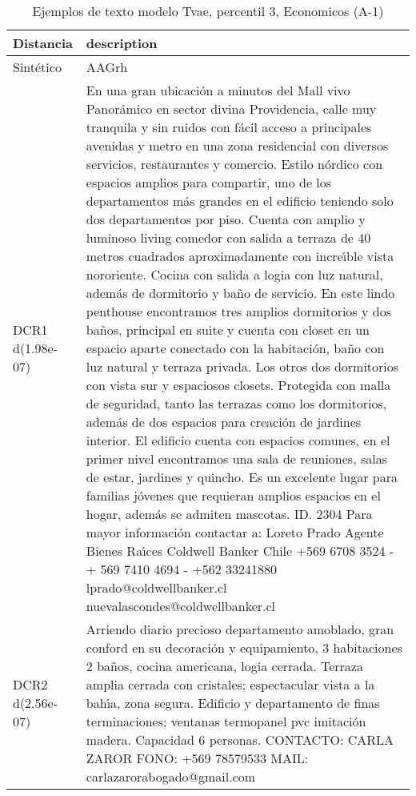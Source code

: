 \begin{table}[H]
\centering
\fontsize{10}{14}\selectfont
\caption{Ejemplos de texto modelo Tvae, percentil 3, Economicos (A-1)}
\label{table-example-economicos-a-1-tvae-3p-text}
\begin{tabular}{|l|m{35em}|}
\hline
\rowcolor[gray]{0.8}
Distancia & description \\
\hline Sintético & AAGrh \\
\hline DCR1 d(1.98e-07) & En una gran ubicaci\'on  a minutos del Mall vivo Panor\'amico en sector divina Providencia, calle muy tranquila y sin ruidos con f\'acil acceso a principales avenidas y metro en una zona residencial con diversos servicios, restaurantes y comercio. 
Estilo n\'ordico con espacios amplios para compartir, uno de los departamentos m\'as grandes en el edificio teniendo solo dos departamentos por piso.
Cuenta con amplio y luminoso living comedor con salida a terraza de 40 metros cuadrados aproximadamente con incre{\'\i}ble vista nororiente. 
Cocina con salida a logia con luz natural, adem\'as de dormitorio y ba\~no de servicio.
En este lindo penthouse encontramos tres amplios dormitorios y dos ba\~nos, principal en suite y cuenta con closet en un espacio aparte conectado con la habitaci\'on, ba\~no con luz natural y terraza privada. 
Los otros dos dormitorios con vista sur y espaciosos closets. 
Protegida con malla de seguridad, tanto las terrazas como los dormitorios, adem\'as de dos espacios para creaci\'on de jardines interior. 
El edificio cuenta con espacios comunes, en el primer nivel encontramos una sala de reuniones, salas de estar, jardines y quincho.
Es un excelente lugar para familias j\'ovenes que requieran amplios espacios en el hogar, adem\'as se admiten mascotas. 
ID. 2304
Para mayor informaci\'on contactar a:
Loreto  Prado 
Agente Bienes Ra{\'\i}ces
Coldwell Banker Chile
+569 6708 3524 - + 569 7410 4694 - +562 33241880
lprado@coldwellbanker.cl
nuevalascondes@coldwellbanker.cl \\
\hline DCR2 d(2.56e-07) & Arriendo diario precioso departamento amoblado, gran conford en su decoraci\'on y equipamiento,
 3 habitaciones  2 ba\~nos,  cocina americana, logia cerrada.  Terraza amplia cerrada con cristales; espectacular vista a la bah{\'\i}a, zona segura.  Edificio y departamento de finas terminaciones; ventanas termopanel pvc imitaci\'on madera. Capacidad 6 personas.  CONTACTO: CARLA ZAROR FONO: +569 78579533 MAIL: carlazarorabogado@gmail.com \\
\hline
\end{tabular}
\end{table}
